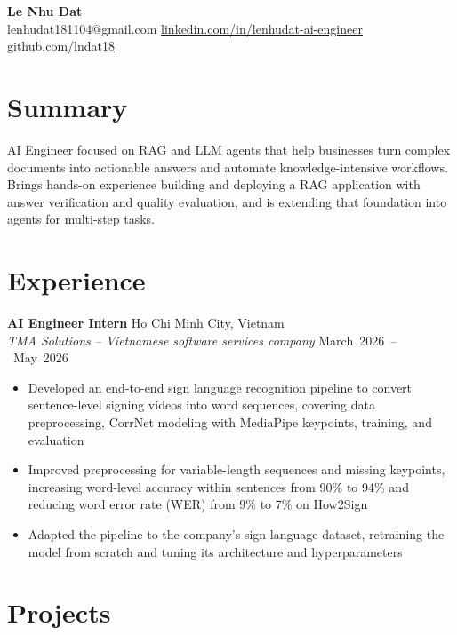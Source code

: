 \documentclass[10pt]{article}
\begin{document}
\begin{center}
    {\LARGE \textbf{Le Nhu Dat}} \\[6pt]
    lenhudat181104@gmail.com
    \; \textbar {}
    \; \textbar \;
    \href{https://linkedin.com/in/lenhudat-ai-engineer}
    {linkedin.com/in/lenhudat-ai-engineer}
    \; \textbar \;
    \href{https://github.com/lndat18}
    {github.com/lndat18}
\end{center}

\section*{Summary}
{\small
AI Engineer focused on RAG and LLM agents that help businesses turn complex documents into actionable answers and automate knowledge-intensive workflows.
Brings hands-on experience building and deploying a RAG application with answer verification and quality evaluation,
and is extending that foundation into agents for multi-step tasks.
}

\section*{Experience}

\textbf{AI Engineer Intern}
\hfill Ho Chi Minh City, Vietnam \\[2pt]
\textit{TMA Solutions -- Vietnamese software services company}
\hfill \mbox{March 2026 -- May 2026}

\begin{itemize}
    \item Developed an end-to-end sign language recognition pipeline to convert sentence-level signing videos into word sequences, covering data preprocessing, CorrNet modeling with \mbox{MediaPipe} keypoints, training, and evaluation
    \item Improved preprocessing for variable-length sequences and missing keypoints, increasing word-level accuracy within sentences from 90\% to 94\% and reducing word error rate (WER) from 9\% to 7\% on How2Sign
    \item Adapted the pipeline to the company's sign language dataset, retraining the model from scratch and tuning its architecture and hyperparameters
\end{itemize}


\section*{Projects}
\vspace{2pt}
\end{document}
